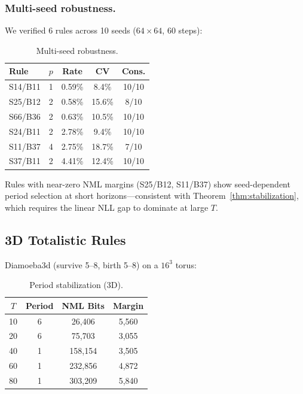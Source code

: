 \documentclass[letterpaper]{article}
\theoremstyle{definition}
\theoremstyle{remark}
\begin{document}
\subsubsection{Multi-seed robustness.}
We verified 6 rules across 10 seeds ($64 \times 64$, 60 steps):

\begin{table}[!htb]
\centering
\caption{Multi-seed robustness.}\label{tab:multiseed}
\small
\begin{tabular}{lcccc}
\toprule
Rule & $p$ & Rate & CV & Cons. \\
\midrule
S14/B11 & 1 & 0.59\% & 8.4\%  & 10/10 \\
S25/B12 & 2 & 0.58\% & 15.6\% & 8/10 \\
S66/B36 & 2 & 0.63\% & 10.5\% & 10/10 \\
S24/B11 & 2 & 2.78\% & 9.4\%  & 10/10 \\
S11/B37 & 4 & 2.75\% & 18.7\% & 7/10 \\
S37/B11 & 2 & 4.41\% & 12.4\% & 10/10 \\
\bottomrule
\end{tabular}
\end{table}

Rules with near-zero NML margins (S25/B12, S11/B37) show seed-dependent period selection at short horizons---consistent with Theorem~\ref{thm:stabilization}, which requires the linear NLL gap to dominate at large $T$.

\subsection{3D Totalistic Rules}

Diamoeba3d (survive 5--8, birth 5--8) on a $16^3$ torus:

\begin{table}[!htb]
\centering
\caption{Period stabilization (3D).}\label{tab:3d-stab}
\begin{tabular}{cccc}
\toprule
$T$ & Period & NML Bits & Margin \\
\midrule
10 & 6 & 26{,}406  & 5{,}560 \\
20 & 6 & 75{,}703  & 3{,}055 \\
40 & 1 & 158{,}154 & 3{,}505 \\
60 & 1 & 232{,}856 & 4{,}872 \\
80 & 1 & 303{,}209 & 5{,}840 \\
\bottomrule
\end{tabular}
\end{table}
\end{document}
